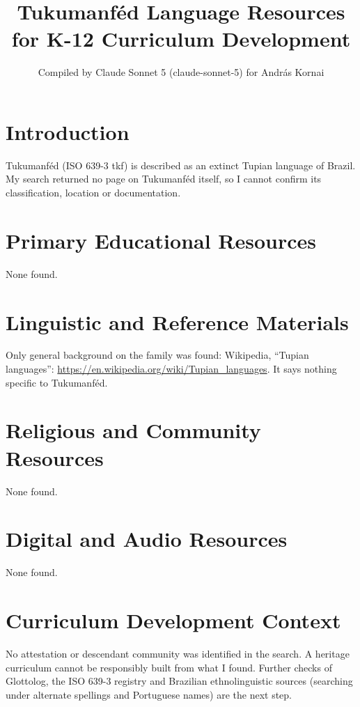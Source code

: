 \documentclass[12pt]{article}
\title{Tukumanf\'ed Language Resources for K-12 Curriculum Development}
\author{Compiled by Claude Sonnet 5 (claude-sonnet-5) for Andr\'as Kornai}
\date{}
\begin{document}
\maketitle

\section{Introduction}
Tukumanf\'ed (ISO 639-3 tkf) is described as an extinct Tupian language of Brazil. My search returned no page on Tukumanf\'ed itself, so I cannot confirm its classification, location or documentation.

\section{Primary Educational Resources}
None found.

\section{Linguistic and Reference Materials}
Only general background on the family was found: Wikipedia, ``Tupian languages'': \url{https://en.wikipedia.org/wiki/Tupian_languages}. It says nothing specific to Tukumanf\'ed.

\section{Religious and Community Resources}
None found.

\section{Digital and Audio Resources}
None found.

\section{Curriculum Development Context}
No attestation or descendant community was identified in the search. A heritage curriculum cannot be responsibly built from what I found. Further checks of Glottolog, the ISO 639-3 registry and Brazilian ethnolinguistic sources (searching under alternate spellings and Portuguese names) are the next step.
\end{document}

